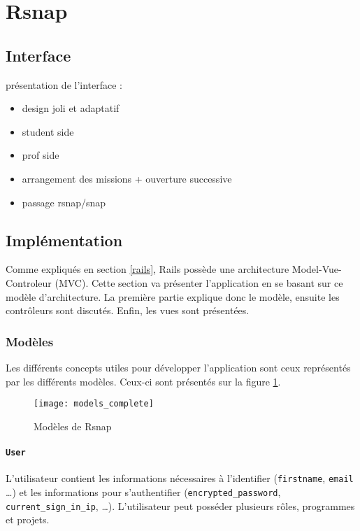 \section{Rsnap}
\graphicspath{{content/7-solution/3-rsnap/images/}}

\subsection{Interface}
présentation de l'interface :
\begin{itemize}
  \item design joli et adaptatif
  \item student side
  \item prof side
  \item arrangement des missions + ouverture successive
  \item passage rsnap/snap
\end{itemize}

\subsection{Implémentation}
Comme expliqués en section \ref{rails}, Rails possède une architecture Model-Vue-Controleur (MVC). Cette section va présenter l'application en se basant sur ce modèle d'architecture. La première partie explique donc le modèle, ensuite les contrôleurs sont discutés. Enfin, les vues sont présentées.

\subsubsection{Modèles}
Les différents concepts utiles pour développer l'application sont ceux représentés par les différents modèles. Ceux-ci sont présentés sur la figure \ref{fig:models}.

\begin{figure}
 \begin{center}
   \texttt{[image: models\_complete]}
   \caption{Modèles de Rsnap}
   \label{fig:models}
 \end{center}
\end{figure}

\paragraph{\texttt{User}} L'utilisateur contient les informations nécessaires à l'identifier (\texttt{firstname}, \texttt{email} \ldots) et les informations pour s'authentifier (\texttt{encrypted\_password}, \texttt{current\_sign\_in\_ip}, \ldots). L'utilisateur peut posséder plusieurs rôles, programmes et projets.

